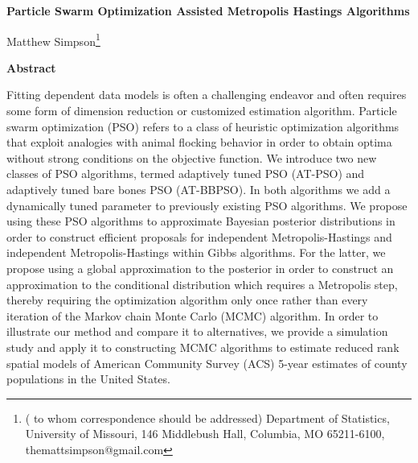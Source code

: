 \documentclass[12pt]{article}
\begin{document}
\thispagestyle{empty} \baselineskip=28pt

\begin{center}
{\LARGE{\bf Particle Swarm Optimization Assisted Metropolis Hastings Algorithms}}
\end{center}

\baselineskip=12pt
\vskip 2mm
\blind
{
  \begin{center}
    Matthew Simpson\footnote{(\baselineskip=10pt to whom correspondence should be addressed)
      Department of Statistics, University of Missouri,
      146 Middlebush Hall, Columbia, MO 65211-6100, themattsimpson@gmail.com}
  \end{center}
} \fi

\vskip 2mm
\begin{center}
{\large{\bf Abstract}}
\end{center}
Fitting dependent data models is often a challenging endeavor and often requires some form of dimension reduction or customized estimation algorithm. Particle swarm optimization (PSO) refers to a class of heuristic optimization algorithms that exploit analogies with animal flocking behavior in order to obtain optima without strong conditions on the objective function. We introduce two new classes of PSO algorithms, termed adaptively tuned PSO (AT-PSO) and adaptively tuned bare bones PSO (AT-BBPSO). In both algorithms we add a dynamically tuned parameter to previously existing PSO algorithms. We propose using these PSO algorithms to approximate Bayesian posterior distributions in order to construct efficient proposals for independent Metropolis-Hastings and independent Metropolis-Hastings within Gibbs algorithms. For the latter, we propose using a global approximation to the posterior in order to construct an approximation to the conditional distribution which requires a Metropolis step, thereby requiring the optimization algorithm only once rather than every iteration of the Markov chain Monte Carlo (MCMC) algorithm. In order to illustrate our method and compare it to alternatives, we provide a simulation study and apply it to constructing MCMC algorithms to estimate reduced rank spatial models of American Community Survey (ACS) 5-year estimates of county populations in the United States.
\baselineskip=12pt 
\end{document}
